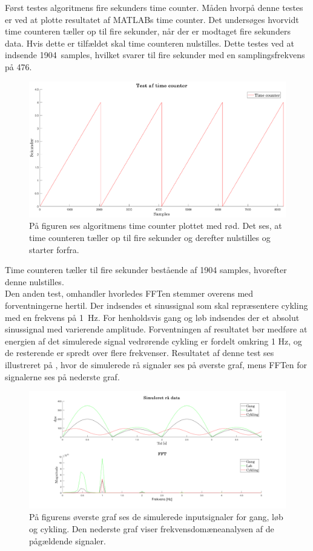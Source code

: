 Først testes algoritmens fire sekunders time counter. Måden hvorpå denne testes er ved at plotte resultatet af MATLABs time counter. Det undersøges hvorvidt time counteren tæller op til fire sekunder, når der er modtaget fire sekunders data. Hvis dette er tilfældet skal time counteren nulstilles. Dette testes ved at indsende 1904~samples, hvilket svarer til fire sekunder med en samplingsfrekvens på 476.  
\begin{figure}[H]
	\centering
	\includegraphics[width=.7\textwidth]{figures/cDesign/sim_counter.png}
	\caption{På figuren ses algoritmens time counter plottet med rød. Det ses, at time counteren tæller op til fire sekunder og derefter nulstilles og starter forfra.}
	\label{fig:sim_count}
\end{figure}\vspace{-.25cm}
Time counteren tæller til fire sekunder bestående af 1904 samples, hvorefter denne nulstilles.\\
Den anden test, omhandler hvorledes FFTen stemmer overens med forventningerne hertil. Der indsendes et sinussignal som skal repræsentere cykling med en frekvens på 1~Hz. For henholdsvis gang og løb indsendes der et absolut sinussignal med varierende amplitude. Forventningen af resultatet bør medføre at energien af det simulerede signal vedrørende cykling er fordelt omkring 1 Hz, og de resterende er spredt over flere frekvenser. Resultatet af denne test ses illustreret på , hvor de simulerede rå signaler ses på øverste graf, mens FFTen for signalerne ses på nederste graf.
\begin{figure}[H]
	\centering
	\includegraphics[width=.75\textwidth]{figures/cDesign/sim_gyro.png}
	\caption{På figurens øverste graf ses de simulerede inputsignaler for gang, løb og cykling. Den nederste graf viser frekvensdomæneanalysen af de pågældende signaler.}
	\label{fig:sim_gyro}
\end{figure}\vspace{-.25cm}
